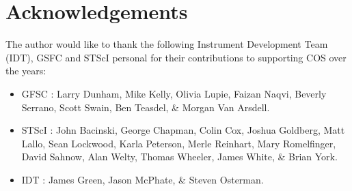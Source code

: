 \documentclass{stsci_report}
\newcommand{\tacq}[1]{\texttt{ACQ/#1}}
\begin{document}
\clearpage



\clearpage

\section{Acknowledgements}
The author would like to thank the following Instrument Development Team (IDT), GSFC and STScI personal for their contributions to supporting COS over the years:
\begin{itemize}
\item{GFSC : }{Larry Dunham, Mike Kelly, Olivia Lupie,  Faizan Naqvi, Beverly Serrano, Scott Swain, Ben Teasdel, \& Morgan Van Arsdell.}
\item{STScI : }{John Bacinski, George Chapman, Colin Cox, Joshua Goldberg, Matt Lallo, Sean Lockwood, Karla Peterson, Merle Reinhart, Mary Romelfinger, David Sahnow, Alan Welty, Thomas Wheeler, James White, \& Brian York.}
\item{IDT : }{James Green, Jason McPhate, \& Steven Osterman.}
\end{itemize}
\end{document}
